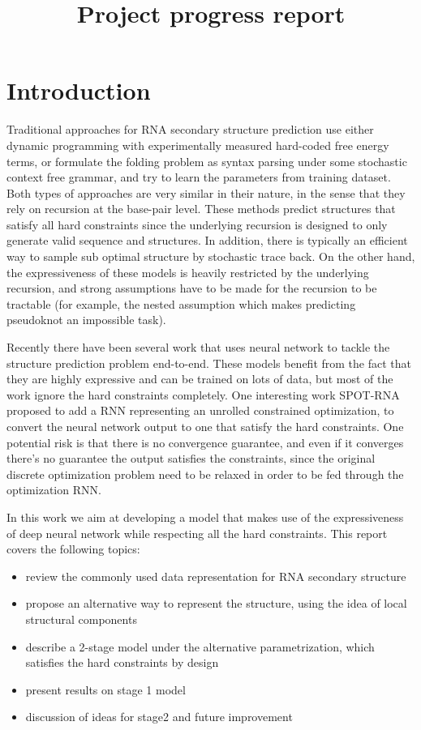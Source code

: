 \documentclass[12pt]{article}
\title{Project progress report}
\date{}
\begin{document}
\maketitle


\section{Introduction}

Traditional approaches for RNA secondary structure prediction use either dynamic programming
with experimentally measured hard-coded free energy terms,
or formulate the folding problem as syntax parsing under some stochastic context free grammar,
and try to learn the parameters from training dataset.
Both types of approaches are very similar in their nature, in the sense that
they rely on recursion at the base-pair level.
These methods predict structures that satisfy all hard constraints since the
underlying recursion is designed to only generate valid sequence and structures.
In addition, there is typically an efficient way to sample sub optimal structure by
stochastic trace back.
On the other hand, the expressiveness of these models is heavily restricted by the underlying
recursion, and strong assumptions have to be made for the recursion to be tractable
(for example, the nested assumption which makes predicting pseudoknot an impossible task).

Recently there have been several work that uses neural network to tackle the structure prediction
problem end-to-end. These models benefit from the fact that they are highly expressive and can be trained on lots of data,
but most of the work ignore the hard constraints completely.
One interesting work SPOT-RNA proposed to add a RNN representing an unrolled
constrained optimization, to convert the neural network output to one that satisfy the hard constraints.
One potential risk is that there is no convergence guarantee, and even if it converges there's no guarantee the output satisfies the constraints,
since the original discrete optimization problem need to be relaxed in order to be fed through the optimization RNN.


In this work we aim at developing a model that makes use of the expressiveness of deep neural network
while respecting all the hard constraints. This report covers the following topics:

\begin{itemize}
    \item review the commonly used data representation for RNA secondary structure
    \item propose an alternative way to represent the structure, using the idea of local structural components
    \item describe a 2-stage model under the alternative parametrization,
which satisfies the hard constraints by design
    \item present results on stage 1 model
    \item discussion of ideas for stage2 and future improvement
\end{itemize}
\end{document}
